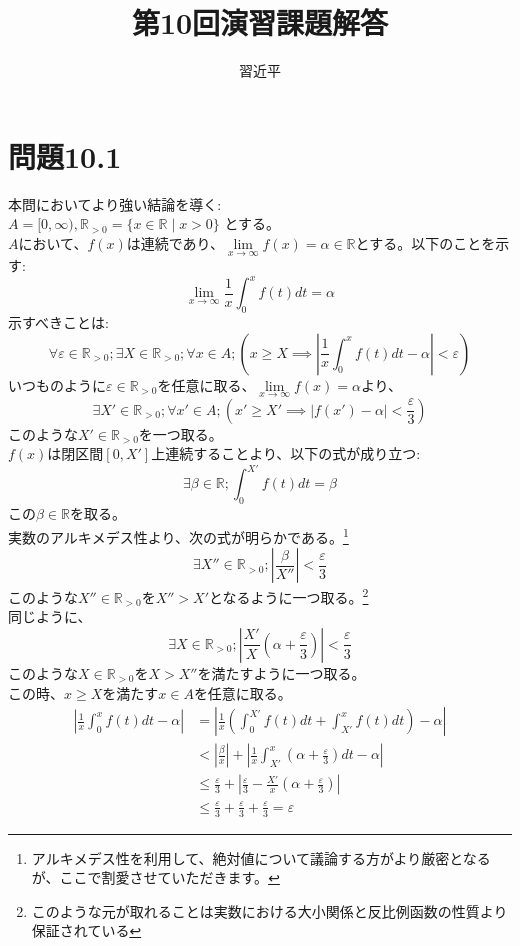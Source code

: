 \documentclass{jreport}
\begin{document}
\title{第10回演習課題解答}
\author{習近平}
\maketitle
\newpage
\tableofcontents
\newpage
\setcounter{chapter}{10}
\section{問題10.1}
\noindent 本問においてより強い結論を導く:\\
$A=[0,\infty ),\mathbb{R}_{>0} = \{x \in \mathbb{R} \mid x>0 \}$ とする。\\
$A$において、$f(x)$は連続であり、$\lim\limits_{x \to \infty} f(x) = \alpha \in \mathbb{R}$とする。以下のことを示す:
$$
\lim_{x \to \infty} \frac{1}{x} \int_0^x f(t)dt = \alpha
$$
示すべきことは:
$$
\forall \varepsilon \in \mathbb{R}_{>0} ;\exists X \in \mathbb{R}_{>0} ; \forall x \in A; \left( x \ge X \implies \left| \frac{1}{x} \int_0^x f(t) dt  - \alpha \right| < \varepsilon \right)
$$
いつものように$\varepsilon \in \mathbb{R}_{>0}$を任意に取る、$\lim\limits_{x \to \infty} f(x) = \alpha$より、
$$
\exists X' \in \mathbb{R}_{>0};\forall x' \in A ; \left( x' \ge X' \implies \left| f(x') - \alpha \right| < \frac{\varepsilon}{3 } \right)
$$
このような$X' \in \mathbb{R}_{>0} $を一つ取る。\\
$f(x)$は閉区間$[0,X']$上連続することより、以下の式が成り立つ:
$$
\exists \beta \in \mathbb{R}; \int_0^{X'} f(t)dt =\beta
$$
この$\beta \in \mathbb{R}$を取る。\\
実数のアルキメデス性より、次の式が明らかである。\footnote{アルキメデス性を利用して、絶対値について議論する方がより厳密となるが、ここで割愛させていただきます。} 
$$
\exists X'' \in \mathbb{R}_{>0}; \left| \frac{\beta}{X''} \right| < \frac{\varepsilon}{3}
$$
このような$X'' \in \mathbb{R}_{>0}$を$X''> X'$となるように一つ取る。\footnote{このような元が取れることは実数における大小関係と反比例函数の性質より保証されている}\\
同じように、
$$
\exists X \in \mathbb{R}_{>0}; \left|  \frac{X'}{X} \left( \alpha + \frac{\varepsilon}{3} \right) \right| < \frac{\varepsilon}{3}
$$
このような$X \in \mathbb{R}_{>0}$を$X>X''$を満たすように一つ取る。\\
この時、$x \ge X$を満たす$x \in A$を任意に取る。\\
\begin{equation}
	\begin{aligned}
		\left| \frac{1}{x} \int_0^x f(t) dt -\alpha \right| & = \left| \frac{1}{x} \left( \int_0^{X'}  f(t) dt + \int_{X'}^x f(t) dt \right) -\alpha \right| \\
		&< \left| \frac{\beta}{x} \right| + \left| \frac{1}{x} \int_{X'}^x \left( \alpha +\frac{\varepsilon}{3} \right) dt - \alpha \right|\\
		&\le \frac{\varepsilon}{3} + \left| \frac{\varepsilon}{3} - \frac{X'}{x} \left( \alpha + \frac{\varepsilon}{3} \right) \right| \\
		&\le \frac{\varepsilon}{3} + \frac{\varepsilon}{3} + \frac{\varepsilon}{3} =\varepsilon
	\end{aligned}
\end{equation}
\end{document}
